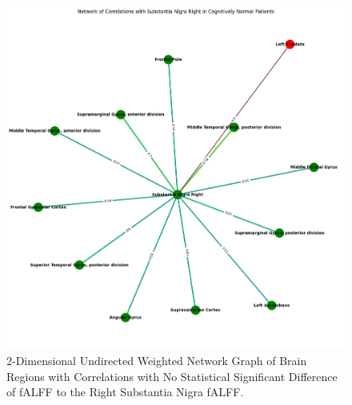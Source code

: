 \documentclass[12pt]{article}
\begin{document}
\begin{figure}[h]  %
    \centering
    \includegraphics[width=\textwidth]{"../img/statistically_significant_correlated_regions_sn_cogn_pdd_graph.png"}  %
    \caption{2-Dimensional Undirected Weighted Network Graph of Brain Regions with Correlations with No Statistical Significant Difference of fALFF to the Right Substantia Nigra fALFF.}
    \label{fig:2D}  %
\end{figure}

\FloatBarrier
\end{document}
